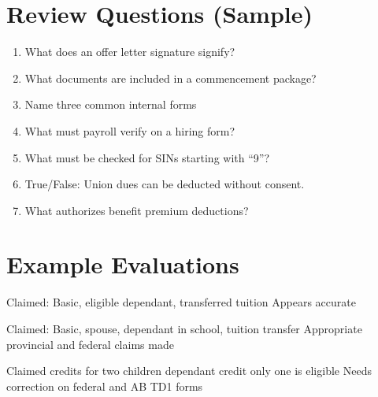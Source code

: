 \documentclass[letterpaper,10pt,english]{sphinxmanual}
\begin{document}
\section{Review Questions (Sample)}
\label{\detokenize{onboarding_employee:review-questions-sample}}\begin{enumerate}
%
\item {} 
\sphinxAtStartPar
What does an offer letter signature signify?

\item {} 
\sphinxAtStartPar
What documents are included in a commencement package?

\item {} 
\sphinxAtStartPar
Name three common internal forms

\item {} 
\sphinxAtStartPar
What must payroll verify on a hiring form?

\item {} 
\sphinxAtStartPar
What must be checked for SINs starting with “9”?

\item {} 
\sphinxAtStartPar
True/False: Union dues can be deducted without consent.

\item {} 
\sphinxAtStartPar
What authorizes benefit premium deductions?

\end{enumerate}


\section{Example Evaluations}
\label{\detokenize{onboarding_employee:example-evaluations}}
\sphinxAtStartPar
{}
\sphinxhyphen{} Claimed: Basic, eligible dependant, transferred tuition
\sphinxhyphen{} Appears accurate

\sphinxAtStartPar
{}
\sphinxhyphen{} Claimed: Basic, spouse, dependant in school, tuition transfer
\sphinxhyphen{} Appropriate provincial and federal claims made

\sphinxAtStartPar
{}
\sphinxhyphen{} Claimed credits for two children
\sphinxhyphen{}  dependant credit \textendash{} only one is eligible
\sphinxhyphen{} Needs correction on federal and AB TD1 forms

\sphinxstepscope
\end{document}
